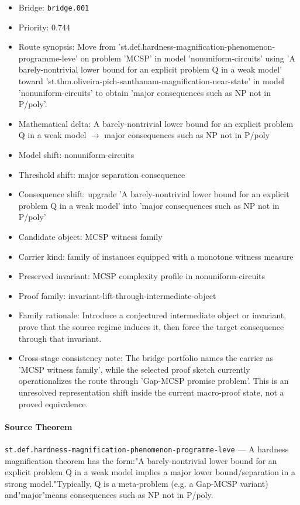 \documentclass[11pt]{article}
\begin{document}
\medskip
\begin{itemize}[leftmargin=*,itemsep=0.2em]
\item Bridge: \texttt{bridge.001}
\item Priority: 0.744
\item Route synopsis: Move from 'st.def.hardness-magnification-phenomenon-programme-leve' on problem 'MCSP' in model 'nonuniform-circuits' using 'A barely-nontrivial lower bound for an explicit problem Q in a weak model' toward 'st.thm.oliveira-pich-santhanam-magnification-near-state' in model 'nonuniform-circuits' to obtain 'major consequences such as NP not in P/poly'.
\item Mathematical delta: A barely-nontrivial lower bound for an explicit problem Q in a weak model $\rightarrow$ major consequences such as NP not in P/poly
\item Model shift: nonuniform-circuits
\item Threshold shift: major separation consequence
\item Consequence shift: upgrade 'A barely-nontrivial lower bound for an explicit problem Q in a weak model' into 'major consequences such as NP not in P/poly'
\item Candidate object: MCSP witness family
\item Carrier kind: family of instances equipped with a monotone witness measure
\item Preserved invariant: MCSP complexity profile in nonuniform-circuits
\item Proof family: invariant-lift-through-intermediate-object
\item Family rationale: Introduce a conjectured intermediate object or invariant, prove that the source regime induces it, then force the target consequence through that invariant.
\item Cross-stage consistency note: The bridge portfolio names the carrier as 'MCSP witness family', while the selected proof sketch currently operationalizes the route through 'Gap-MCSP promise problem'. This is an unresolved representation shift inside the current macro-proof state, not a proved equivalence.
\end{itemize}

\paragraph{Source Theorem}
\texttt{st.def.hardness-magnification-phenomenon-programme-leve} --- A hardness magnification theorem has the form:"A barely-nontrivial lower bound for an explicit problem Q in a weak model implies a major lower bound/separation in a strong model."Typically, Q is a meta-problem (e.g. a Gap-MCSP variant) and"major"means consequences such as NP not in P/poly.
\end{document}
